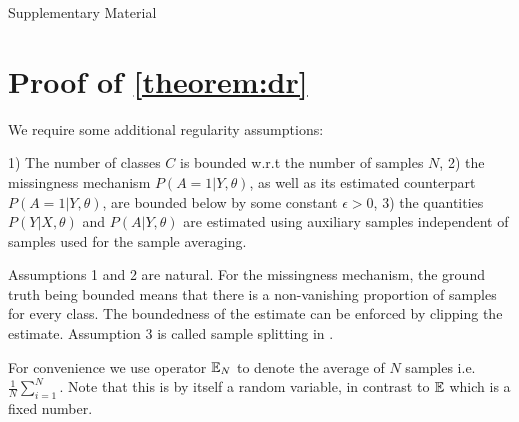 
\clearpage
\begin{center}
Supplementary Material
\end{center}


\section{Proof of \cref{theorem:dr}}
We require some additional regularity assumptions:
\begin{assumption} 1) The number of classes $C$ is bounded w.r.t the number of samples $N$, 2) the missingness mechanism $P(A=1|Y,\theta)$, as well as its estimated counterpart $P(A=1|Y,\theta)$, are bounded below by some constant $\epsilon > 0$, 3) the quantities $P(Y|X,\theta)$ and $P(A|Y,\theta)$ are estimated using auxiliary samples independent of samples used for the sample averaging.
\label{assumption:extra}
\end{assumption}
Assumptions 1 and 2 are natural. For the missingness mechanism, the ground truth being bounded means that there is a non-vanishing proportion of samples for every class. The boundedness of the estimate can be enforced by clipping the estimate. Assumption 3 is called sample splitting in \cite{kennedy-dr}.

For convenience we use operator $\mathbb{E}_N$ to denote the average of $N$ samples i.e. $\frac{1}{N}\sum_{i=1}^N$. Note that this is by itself a random variable, in contrast to $\mathbb{E}$ which is a fixed number.

